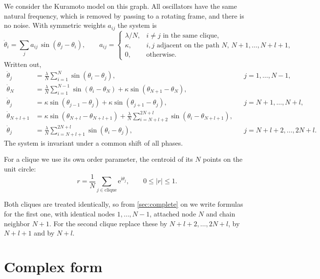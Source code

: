 \documentclass[a4paper,11pt]{article}
\newcommand{\e}{\mathrm{e}}
\newcommand{\ii}{\mathrm{i}}
\theoremstyle{remark}
\begin{document}
We consider the Kuramoto model \cite{Kuramoto1975} on this graph. All
oscillators have the same natural frequency, which is removed by passing to
a rotating frame, and there is no noise. With symmetric weights $a_{ij}$ the
system is
\begin{equation}\label{eq:full-system}
\dot\theta_i=\sum_{j} a_{ij}\,\sin(\theta_j-\theta_i),\qquad
a_{ij}=\begin{cases}
\lambda/N, & i\neq j \text{ in the same clique},\\
\kappa, & i,j \text{ adjacent on the path } N,\,N+1,\dots,N+l+1,\\
0, & \text{otherwise.}
\end{cases}
\end{equation}
Written out,
\begin{equation}\label{eq:full-system-explicit}
\begin{aligned}
\dot\theta_j&=\frac{\lambda}{N}\sum_{i=1}^{N}\sin(\theta_i-\theta_j), && j=1,\dots,N-1,\\
\dot\theta_N&=\frac{\lambda}{N}\sum_{i=1}^{N-1}\sin(\theta_i-\theta_N)+\kappa\sin(\theta_{N+1}-\theta_N),\\
\dot\theta_j&=\kappa\sin(\theta_{j-1}-\theta_j)+\kappa\sin(\theta_{j+1}-\theta_j), && j=N+1,\dots,N+l,\\
\dot\theta_{N+l+1}&=\kappa\sin(\theta_{N+l}-\theta_{N+l+1})+\frac{\lambda}{N}\sum_{i=N+l+2}^{2N+l}\sin(\theta_i-\theta_{N+l+1}),\\
\dot\theta_j&=\frac{\lambda}{N}\sum_{i=N+l+1}^{2N+l}\sin(\theta_i-\theta_j), && j=N+l+2,\dots,2N+l.
\end{aligned}
\end{equation}
The system is invariant under a common shift of all phases.

For a clique we use its own order parameter, the centroid of its $N$ points on
the unit circle:
\begin{equation}\label{eq:order-parameter}
r=\frac1N\sum_{j\in\text{clique}}\e^{\ii\theta_j},\qquad 0\le |r|\le 1 .
\end{equation}

Both cliques are treated identically, so from \cref{sec:complete} on we write
formulas for the first one, with identical nodes $1,\dots,N-1$, attached node
$N$ and chain neighbor $N+1$. For the second clique replace these by
$N+l+2,\dots,2N+l$, by $N+l+1$ and by $N+l$.

\section{Complex form}\label{sec:complex}
\end{document}
